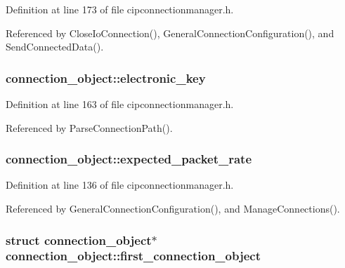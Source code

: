 \-Definition at line 173 of file cipconnectionmanager.\-h.



\-Referenced by \-Close\-Io\-Connection(), \-General\-Connection\-Configuration(), and \-Send\-Connected\-Data().

\hypertarget{structconnection__object_abe23c92282c8d23c2218f3a5a73a9b5d}{
\subsubsection[{electronic\-\_\-key}]{ {\bf connection\-\_\-object\-::electronic\-\_\-key}}}\label{d1/d48/structconnection__object_abe23c92282c8d23c2218f3a5a73a9b5d}


\-Definition at line 163 of file cipconnectionmanager.\-h.



\-Referenced by \-Parse\-Connection\-Path().

\hypertarget{structconnection__object_ae6744745719b245f03208fc6549e42b4}{
\subsubsection[{expected\-\_\-packet\-\_\-rate}]{ {\bf connection\-\_\-object\-::expected\-\_\-packet\-\_\-rate}}}\label{d1/d48/structconnection__object_ae6744745719b245f03208fc6549e42b4}


\-Definition at line 136 of file cipconnectionmanager.\-h.



\-Referenced by \-General\-Connection\-Configuration(), and \-Manage\-Connections().

\hypertarget{structconnection__object_ac9ff98e4743a376aadb9de2ef521ca83}{
\subsubsection[{first\-\_\-connection\-\_\-object}]{\setlength{\rightskip}{0pt plus 5cm}struct {\bf connection\-\_\-object}$\ast$ {\bf connection\-\_\-object\-::first\-\_\-connection\-\_\-object}}}\label{d1/d48/structconnection__object_ac9ff98e4743a376aadb9de2ef521ca83}


